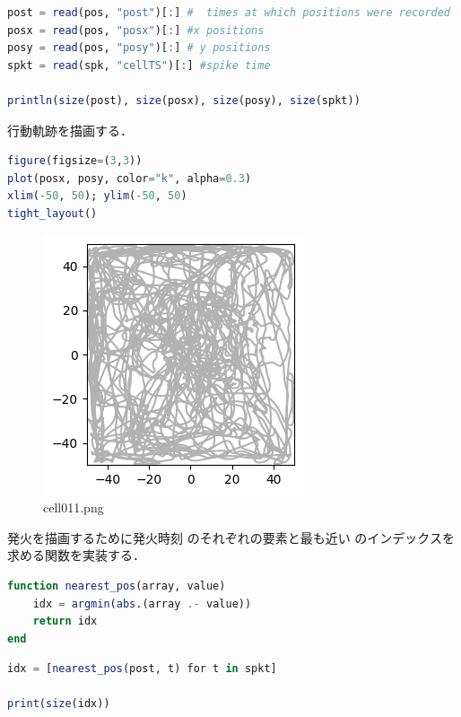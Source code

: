 \begin{lstlisting}[language=julia]
post = read(pos, "post")[:] #  times at which positions were recorded
posx = read(pos, "posx")[:] #x positions
posy = read(pos, "posy")[:] # y positions
spkt = read(spk, "cellTS")[:] #spike time

println(size(post), size(posx), size(posy), size(spkt))
\end{lstlisting}
行動軌跡を描画する．
\begin{lstlisting}[language=julia]
figure(figsize=(3,3))
plot(posx, posy, color="k", alpha=0.3)
xlim(-50, 50); ylim(-50, 50)
tight_layout()
\end{lstlisting}
\begin{figure}[ht]
	\centering
	\includegraphics[scale=0.8, max width=\linewidth]{./fig/appendix/grid-cells-decoding/cell011.png}
	\caption{cell011.png}
	\label{cell011.png}
\end{figure}
発火を描画するために発火時刻  のそれぞれの要素と最も近い  のインデックスを求める関数を実装する．
\begin{lstlisting}[language=julia]
function nearest_pos(array, value)
    idx = argmin(abs.(array .- value))
    return idx
end
\end{lstlisting}
\begin{lstlisting}[language=julia]
idx = [nearest_pos(post, t) for t in spkt]

print(size(idx))
\end{lstlisting}
